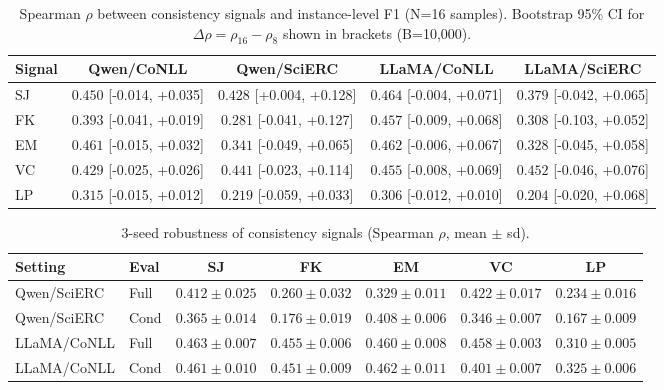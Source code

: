 \begin{table}[t]
\centering
\caption{Spearman $\rho$ between consistency signals and instance-level F1 (N=16 samples). Bootstrap 95\% CI for $\Delta\rho = \rho_{16} - \rho_8$ shown in brackets (B=10{,}000).}
\label{tab:bootstrap_nscaling}
\small
\begin{tabular}{lcccc}
\toprule
Signal & Qwen/CoNLL & Qwen/SciERC & LLaMA/CoNLL & LLaMA/SciERC \\
\midrule
\textrm{SJ} & $0.450$ [-0.014, +0.035] & $0.428$ [+0.004, +0.128] & $0.464$ [-0.004, +0.071] & $0.379$ [-0.042, +0.065] \\
\textrm{FK} & $0.393$ [-0.041, +0.019] & $0.281$ [-0.041, +0.127] & $0.457$ [-0.009, +0.068] & $0.308$ [-0.103, +0.052] \\
\textrm{EM} & $0.461$ [-0.015, +0.032] & $0.341$ [-0.049, +0.065] & $0.462$ [-0.006, +0.067] & $0.328$ [-0.045, +0.058] \\
\textrm{VC} & $0.429$ [-0.025, +0.026] & $0.441$ [-0.023, +0.114] & $0.455$ [-0.008, +0.069] & $0.452$ [-0.046, +0.076] \\
\textrm{LP} & $0.315$ [-0.015, +0.012] & $0.219$ [-0.059, +0.033] & $0.306$ [-0.012, +0.010] & $0.204$ [-0.020, +0.068] \\
\bottomrule
\end{tabular}
\end{table}

\begin{table}[t]
\centering
\caption{3-seed robustness of consistency signals (Spearman $\rho$, mean $\pm$ sd).}
\label{tab:3seed_robustness}
\small
\begin{tabular}{llccccc}
\toprule
Setting & Eval & \textrm{SJ} & \textrm{FK} & \textrm{EM} & \textrm{VC} & \textrm{LP} \\
\midrule
Qwen/SciERC & Full & $0.412 \pm 0.025$ & $0.260 \pm 0.032$ & $0.329 \pm 0.011$ & $0.422 \pm 0.017$ & $0.234 \pm 0.016$ \\
Qwen/SciERC & Cond & $0.365 \pm 0.014$ & $0.176 \pm 0.019$ & $0.408 \pm 0.006$ & $0.346 \pm 0.007$ & $0.167 \pm 0.009$ \\
\midrule
LLaMA/CoNLL & Full & $0.463 \pm 0.007$ & $0.455 \pm 0.006$ & $0.460 \pm 0.008$ & $0.458 \pm 0.003$ & $0.310 \pm 0.005$ \\
LLaMA/CoNLL & Cond & $0.461 \pm 0.010$ & $0.451 \pm 0.009$ & $0.462 \pm 0.011$ & $0.401 \pm 0.007$ & $0.325 \pm 0.006$ \\
\bottomrule
\end{tabular}
\end{table}
